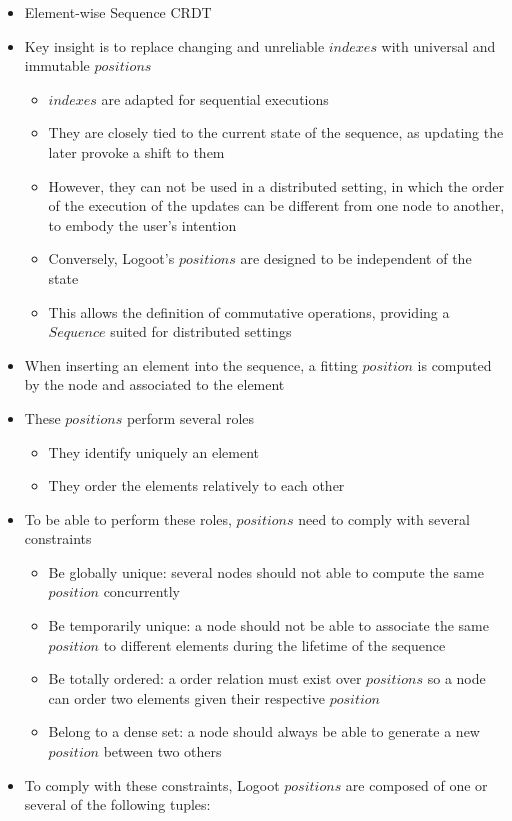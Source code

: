 \documentclass{article}
\begin{document}
\begin{itemize}
    \item Element-wise Sequence \ac{CRDT}
    \item Key insight is to replace changing and unreliable $indexes$ with universal and immutable $positions$
    \begin{itemize}
        \item $indexes$ are adapted for sequential executions
        \item They are closely tied to the current state of the sequence, as updating the later provoke a shift to them
        \item However, they can not be used in a distributed setting, in which the order of the execution of the updates can be different from one node to another, to embody the user's intention
        \item Conversely, Logoot's $positions$ are designed to be independent of the state
        \item This allows the definition of commutative operations, providing a $Sequence$ suited for distributed settings
    \end{itemize}


    \item When inserting an element into the sequence, a fitting $position$ is computed by the node and associated to the element
    \item These $positions$ perform several roles
    \begin{itemize}
        \item They identify uniquely an element
        \item They order the elements relatively to each other
    \end{itemize}
    \item To be able to perform these roles, $positions$ need to comply with several constraints
    \begin{itemize}
        \item Be globally unique: several nodes should not able to compute the same $position$ concurrently
        \item Be temporarily unique: a node should not be able to associate the same $position$ to different elements during the lifetime of the sequence
        \item Be totally ordered: a order relation must exist over $positions$ so a node can order two elements given their respective $position$
        \item Belong to a dense set: a node should always be able to generate a new $position$ between two others
    \end{itemize}
    \item To comply with these constraints, Logoot $positions$ are composed of one or several of the following tuples:


\end{itemize}
\end{document}
